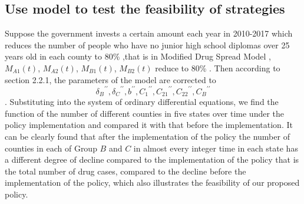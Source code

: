 \documentclass{mcmthesis}
\begin{document}
\subsection{Use model to test the feasibility of strategies}
Suppose the government invests a certain amount each year in 2010-2017 which reduces the number of people who have no junior high school diplomas over 25 years old in each county to 80\% ,that is in Modified Drug Spread Model , ${M_{A1}}(t)$, ${M_{A2}}(t)$, ${M_{B1}}(t)$, ${M_{B2}}(t)$ reduce to 80\% . Then according to section 2.2.1, the parameters of the  model are corrected to 
\begin{equation}{\delta _B}^{\prime \prime },{\delta _C}^{\prime \prime },{b^{\prime \prime }},{C_1}^{\prime \prime },{C_{21}}^{\prime \prime },{C_{22}}^{\prime \prime },{C_B}^{\prime \prime }\end{equation}. Substituting into the system of ordinary differential equations, we find the function of the number of different counties in five states over time under the policy implementation and compared it with that before the implementation. It can be clearly found that after the implementation of the policy the number of counties in each of Group $B$ and $C$ in almost every integer time in each state has a different degree of decline compared to the implementation of the policy that is the total number of drug cases, compared to the decline before the implementation of the policy, which also illustrates the feasibility of our proposed policy.
\end{document}
